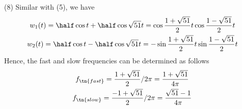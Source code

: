 (8) Similar with (5), we have
\begin{gather}
    w_1(t) = \half\cos t + \half\cos\sqrt{51}t = \cos\frac{1+\sqrt{51}}{2}t\cos\frac{1-\sqrt{51}}{2}t \\
    w_2(t) = \half\cos t - \half\cos\sqrt{51}t = -\sin\frac{1+\sqrt{51}}{2}t\sin\frac{1-\sqrt{51}}{2}t
\end{gather}
Hence, the fast and slow frequencies can be determined as follows
\begin{gather}
    f_{\tn{fast}} = \frac{1+\sqrt{51}}{2}/2\pi = \frac{1+\sqrt{51}}{4\pi} \\
    f_{\tn{slow}} = \frac{-1+\sqrt{51}}{2}/2\pi = \frac{\sqrt{51}-1}{4\pi}
\end{gather}


